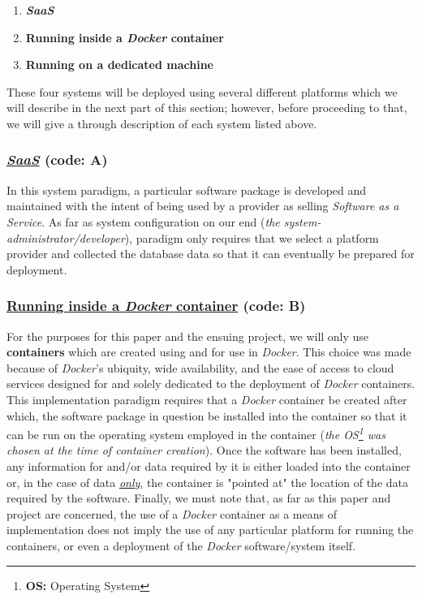 \begin{spacing}{1.40}
\begin{enumerate}[label=\Large{\textbf{\Alph*}):}]
	\item \textbf{\emph{SaaS}}
	\item \textbf{Running inside a \emph{Docker} container}
	\item \textbf{Running on a dedicated machine}
\end{enumerate}
\end{spacing}

These four systems will be deployed using several different platforms which we will describe in the next part of this section; however, before proceeding to that, we will give a through description of each system listed above.


\subsubsection{\underline{\emph{SaaS}} (code: \textbf{A}) }

In this system paradigm, a particular software package is developed and maintained with the intent of being used by a provider as selling \emph{Software as a Service}. As far as system configuration on our end (\emph{the system-administrator/developer}), paradigm only requires that we select a platform provider and collected the database data so that it can eventually be prepared for deployment.


\subsubsection{\underline{Running inside a \emph{Docker} container} (code: \textbf{B}) }

For the purposes for this paper and the ensuing project, we will only use \textbf{containers} which are created using and for use in \emph{Docker}.  This choice was made because of \emph{Docker}'s ubiquity, wide availability, and the ease of access to cloud services designed for and solely dedicated to the deployment of \emph{Docker} containers.  This implementation paradigm requires that a \emph{Docker} container be created after which, the software package in question be installed into the container so that it can be run on the operating system employed in the container (\emph{the OS\footnote{\textbf{OS: } Operating System} was chosen at the time of container creation}). Once the software has been installed, any information for and/or data required by it is either loaded into the container or, in the case of data \underline{\emph{only}}, the container is "pointed at" the location of the data required by the software.  Finally, we must note that, as far as this paper and project are concerned, the use of a \emph{Docker} container as a means of implementation does not imply the use of any particular platform for running the containers, or even a deployment of the \emph{Docker} software/system itself. 


